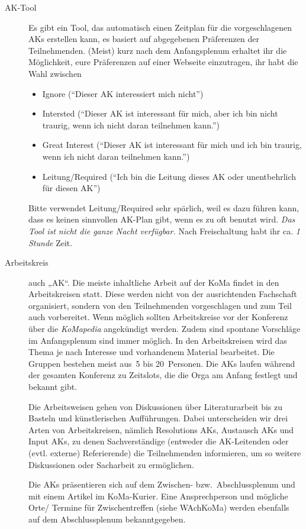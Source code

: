 \begin{description}
\item[AK-Tool]
    Es gibt ein Tool, das automatisch einen Zeitplan für die vorgeschlagenen AKs erstellen kann, es basiert auf abgegebenen Präferenzen der Teilnehmenden. (Meist) kurz nach dem Anfangsplenum erhaltet ihr die Möglichkeit, eure Präferenzen auf einer Webseite einzutragen, ihr habt die Wahl zwischen
    \begin{itemize}
        \item Ignore (\enquote{Dieser AK interessiert mich nicht})
        \item Intersted (\enquote{Dieser AK ist interessant für mich, aber ich bin nicht traurig, wenn ich nicht daran teilnehmen kann.})
        \item Great Interest (\enquote{Dieser AK ist interessant für mich und ich bin traurig, wenn ich nicht daran teilnehmen kann.})
        \item Leitung/Required (\enquote{Ich bin die Leitung dieses AK oder unentbehrlich für diesen AK})
    \end{itemize}
    Bitte verwendet Leitung/Required sehr spärlich, weil es dazu führen kann, dass es keinen sinnvollen AK-Plan gibt, wenn es zu oft benutzt wird.
    \emph{Das Tool ist nicht die ganze Nacht verfügbar.} Nach Freischaltung habt ihr ca. \emph{1 Stunde} Zeit.

\item[Arbeitskreis]
    auch „AK“. Die meiste inhaltliche Arbeit auf der KoMa findet in den Arbeitskreisen statt. Diese werden nicht von der ausrichtenden Fachschaft organisiert, sondern von den Teilnehmenden vorgeschlagen und zum Teil auch vorbereitet. Wenn möglich sollten Arbeitskreise vor der Konferenz über die \emph{KoMapedia} angekündigt werden. Zudem sind spontane Vorschläge im Anfangsplenum sind immer möglich. In den Arbeitskreisen wird das Thema je nach Interesse und vorhandenem Material bearbeitet. Die Gruppen bestehen meist aus~5 bis 20~Personen. Die AKs laufen während der gesamten Konferenz zu Zeitslots, die die Orga am Anfang festlegt und bekannt gibt.
	
	Die Arbeitsweisen gehen	von Diskussionen über Literaturarbeit bis zu Basteln und künstlerischen Aufführungen. Dabei unterscheiden wir drei Arten von Arbeitskreisen, nämlich Resolutions AKs, Austausch AKs und Input AKs, zu denen Sachverständige (entweder die AK-Leitenden oder (evtl. externe) Referierende) die Teilnehmenden informieren, um so weitere Diskussionen oder Sacharbeit zu ermöglichen.

	Die AKs präsentieren sich auf dem Zwischen- bzw.\ Abschlussplenum und mit einem Artikel im KoMa-Kurier. Eine Ansprechperson und mögliche Orte/ Termine für Zwischentreffen (siehe WAchKoMa) werden ebenfalls auf dem Abschlussplenum bekanntgegeben.


\end{description}
